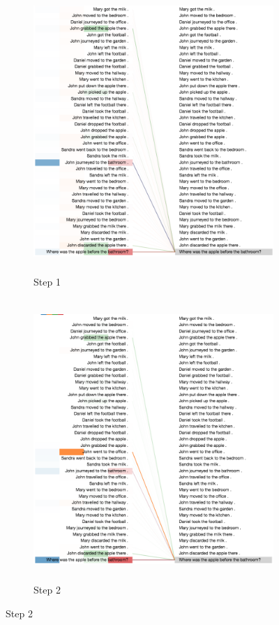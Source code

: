 \begin{figure}[h!]\ContinuedFloat
\begin{minipage}{\textwidth}
    \centering
    \begin{subfigure}[t]{\textwidth}
        \centering
        \includegraphics[height=4.2in]{04-part-03/chapter-06/figs_and_tables/figs_attention_babi/e4-step1}
        \caption{Step 1}
    \end{subfigure}%
    \hfill \hfill
    \begin{subfigure}[t]{\textwidth}
        \centering
        \includegraphics[height=4.2in, trim={0 0 0 0.1cm},clip]{04-part-03/chapter-06/figs_and_tables/figs_attention_babi/e4-step2}
        \caption{Step 2}
    \end{subfigure}
\end{minipage}
\end{figure}
